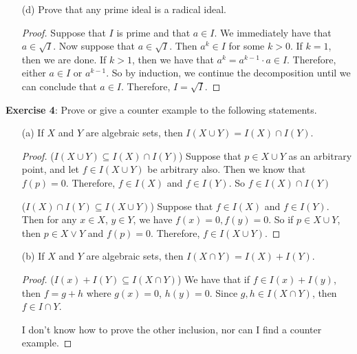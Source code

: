 \documentclass{article}
\begin{document}
\begin{itemize}
        \item [(d)] Prove that any prime ideal is a radical ideal.
            \begin{proof}
                Suppose that $I$ is prime and that $a \in I$. We immediately have that $a \in \sqrt{I}$. Now suppose that $a \in \sqrt{I}$. Then $a^{k} \in I$ for some $k > 0$. If $k = 1$, then we are done. If $k > 1$, then we have that $a^{k} = a^{k - 1} \cdot a \in I$. Therefore, either $a \in I$ or $a^{k - 1}$. So by induction, we continue the decomposition until we can conclude that $a \in I$. Therefore, $I = \sqrt{I}$.
            \end{proof}
    \end{itemize}

\textbf{Exercise 4}: Prove or give a counter example to the following statements.
    \begin{itemize}
        \item [(a)] If $X$ and $Y$ are algebraic sets, then $I(X \cup Y) = I(X) \cap I(Y)$.
            \begin{proof}
                ($I(X \cup Y) \subseteq I(X) \cap  I(Y)$) Suppose that $p \in X \cup Y$ as an arbitrary point, and let $f \in I(X \cup Y)$ be arbitrary also. Then we know that $f(p) = 0$. Therefore, $f \in I(X)$ and $f \in I(Y)$. So $f \in I(X) \cap I(Y)$

                ($I(X) \cap I(Y) \subseteq I(X \cup  Y)$) Suppose that $f \in I(X)$ and $f \in I(Y)$. Then for any $x \in X$, $y \in Y$, we have $f(x) = 0, f(y) = 0$. So if $p \in X \cup Y$, then $p \in X \lor Y$ and $f(p) = 0$. Therefore, $f \in I(X \cup Y)$.
            \end{proof} 

        \item [(b)] If $X$ and $Y$ are algebraic sets, then $I(X \cap Y) = I(X) + I(Y)$. 
            \begin{proof}
                ($I(x) + I(Y) \subseteq I(X \cap Y)$) We have that if $f \in I(x) + I(y)$, then $f = g + h$ where $g(x) = 0$, $h(y) = 0$. Since $g, h \in I(X \cap Y)$, then $f \in I \cap Y$.

                I don't know how to prove the other inclusion, nor can I find a counter example.
            \end{proof}
    \end{itemize}
\end{document}
